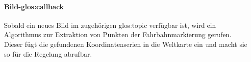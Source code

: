 \paragraph{Bild-\gls{glos:callback}}
Sobald ein neues Bild im zugehörigen \gls{glos:topic} verfügbar ist, wird ein Algorithmus zur Extraktion von Punkten der Fahrbahnmarkierung gerufen. Dieser fügt die gefundenen Koordinatenserien in die Weltkarte ein und macht sie so für die Regelung abrufbar.
